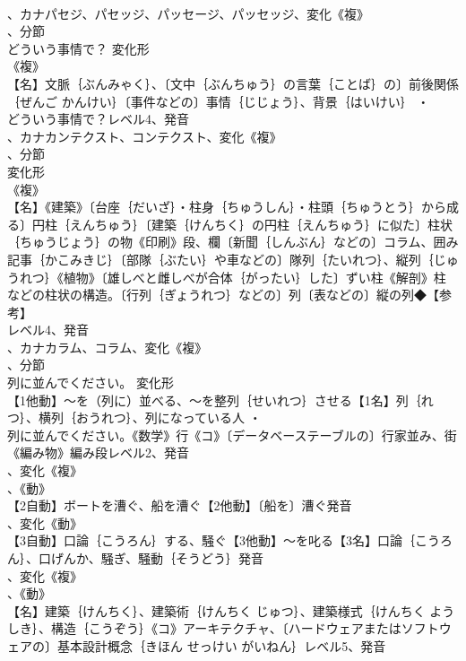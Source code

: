 \documentclass[8pt]{extreport}
\begin{document}
\begin{CJK}{UTF8}{min}
\\	、カナパセジ、パセッジ、パッセージ、パッセッジ、変化《複》
\\	、分節
\\	どういう事情で？	変化形 
\\	《複》
\\	【名】文脈｛ぶんみゃく｝、〔文中｛ぶんちゅう｝の言葉｛ことば｝の〕前後関係｛ぜんご かんけい｝〔事件などの〕事情｛じじょう｝、背景｛はいけい｝ ・
\\	どういう事情で？レベル4、発音
\\	、カナカンテクスト、コンテクスト、変化《複》
\\	、分節
\\	変化形 
\\	《複》
\\	【名】《建築》〔台座｛だいざ｝・柱身｛ちゅうしん｝・柱頭｛ちゅうとう｝から成る〕円柱｛えんちゅう｝〔建築｛けんちく｝の円柱｛えんちゅう｝に似た〕柱状｛ちゅうじょう｝の物《印刷》段、欄〔新聞｛しんぶん｝などの〕コラム、囲み記事｛かこみきじ｝〔部隊｛ぶたい｝や車などの〕隊列｛たいれつ｝、縦列｛じゅうれつ｝《植物》〔雄しべと雌しべが合体｛がったい｝した〕ずい柱《解剖》柱
\\	などの柱状の構造。〔行列｛ぎょうれつ｝などの〕列〔表などの〕縦の列◆【参考】
\\	レベル4、発音
\\	、カナカラム、コラム、変化《複》
\\	、分節
\\	列に並んでください。	変化形 
\\	【1他動】～を（列に）並べる、～を整列｛せいれつ｝させる【1名】列｛れつ｝、横列｛おうれつ｝、列になっている人 ・
\\	列に並んでください。《数学》行《コ》〔データベーステーブルの〕行家並み、街《編み物》編み段レベル2、発音
\\	、変化《複》
\\	、《動》
\\	【2自動】ボートを漕ぐ、船を漕ぐ【2他動】〔船を〕漕ぐ発音
\\	、変化《動》
\\	【3自動】口論｛こうろん｝する、騒ぐ【3他動】～を叱る【3名】口論｛こうろん｝、口げんか、騒ぎ、騒動｛そうどう｝発音
\\	、変化《複》
\\	、《動》
\\	【名】建築｛けんちく｝、建築術｛けんちく じゅつ｝、建築様式｛けんちく ようしき｝、構造｛こうぞう｝《コ》アーキテクチャ、〔ハードウェアまたはソフトウェアの〕基本設計概念｛きほん せっけい がいねん｝レベル5、発音

\end{CJK}
\end{document}
